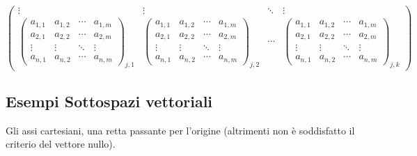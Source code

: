 \documentclass[a4paper]{article}
\begin{document}
\[\begin{pmatrix}
        \vdots  & \vdots  & \ddots & \vdots  \\
        {\begin{pmatrix} a_{1,1} & a_{1,2} & \cdots & a_{1,m} \\ a_{2,1} & a_{2,2} & \cdots & a_{2,m} \\ \vdots  & \vdots  & \ddots & \vdots  \\ a_{n,1} & a_{n,2} & \cdots & a_{n,m} \end{pmatrix}}_{j,1} & {\begin{pmatrix} a_{1,1} & a_{1,2} & \cdots & a_{1,m} \\ a_{2,1} & a_{2,2} & \cdots & a_{2,m} \\ \vdots  & \vdots  & \ddots & \vdots  \\ a_{n,1} & a_{n,2} & \cdots & a_{n,m} \end{pmatrix}}_{j,2} & \cdots & {\begin{pmatrix} a_{1,1} & a_{1,2} & \cdots & a_{1,m} \\ a_{2,1} & a_{2,2} & \cdots & a_{2,m} \\ \vdots  & \vdots  & \ddots & \vdots  \\ a_{n,1} & a_{n,2} & \cdots & a_{n,m} \end{pmatrix}}_{j,k}   
    \end{pmatrix}
\]

\subsection{Esempi Sottospazi vettoriali}

Gli assi cartesiani, una retta passante per l'origine (altrimenti non è soddisfatto il criterio del vettore nullo).
\end{document}
